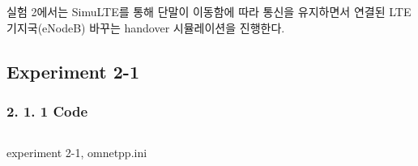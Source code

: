 \newpage
\vspace{-6mm}
\section{}
실험 2에서는 SimuLTE를 통해 단말이 이동함에 따라 통신을 유지하면서 연결된 LTE 기지국(eNodeB) 바꾸는 handover 시뮬레이션을 진행한다.
\subsection*{Experiment 2-1}
    \subsubsection*{2. 1. 1 Code}
    \vspace{-3mm}
            \vspace{-2mm}
            \begin{listing}[h!]
            \inputminted[framerule = 1pt,framesep = 2mm , frame = lines, fontsize=\footnotesize]{c}{./code/week11/Experiment_02/omnet3.cpp}
            \vspace{-3mm}
            \caption{\footnotesize experiment 2-1, omnetpp.ini}
            \end{listing}
            \vspace{-6mm}
